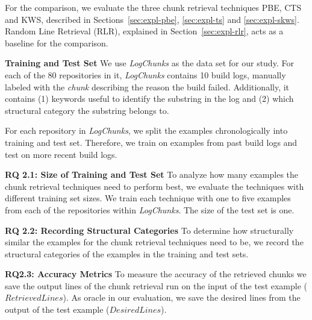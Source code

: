For the comparison, we evaluate the three chunk retrieval techniques
PBE, CTS and KWS, described in Sections~\ref{sec:expl-pbe},
\ref{sec:expl-ts} and \ref{sec:expl-skws}.
Random Line Retrieval
(RLR), explained in Section~\ref{sec:expl-rlr}, acts as a baseline for
the comparison.

\noindent
\textbf{Training and Test Set}
We use \emph{LogChunks} as the data set for our study.
For each of the
80 repositories in it, \emph{LogChunks} contains 10 build logs,
manually labeled with the \emph{chunk} describing the
reason the build failed.
Additionally, it contains (1) keywords useful
to identify the substring in the log  and (2) which structural category
the substring belongs to.

For each repository in \emph{LogChunks}, we split the examples
chronologically into training and test set.
Therefore, we train on
examples from past build logs and test on more recent build logs.

\noindent %
\textbf{RQ 2.1: Size of Training and Test Set}
To analyze how many examples the chunk retrieval techniques need to
perform best, we evaluate the techniques with different training set
sizes.
We train each technique with one to five examples from each of
the repositories within \emph{LogChunks}.
The size of the test set is
one.

\noindent
\textbf{RQ 2.2: Recording Structural Categories}
To determine how structurally similar the examples for the chunk
retrieval techniques need to be, we record the structural categories
of the examples in the training and test sets.

\noindent
\textbf{RQ2.3: Accuracy Metrics}
To measure the accuracy of the retrieved chunks we save the output
lines of the chunk retrieval run on the input of the test example
($\mathit{RetrievedLines}$).
As oracle in our evaluation, we save the
desired lines from the output of the test example
($\mathit{DesiredLines}$).

